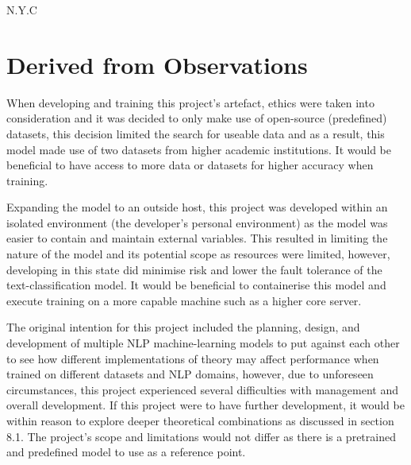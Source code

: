 N.Y.C

\section{Derived from Observations}

When developing and training this project’s artefact, ethics were taken into consideration and it was decided to only make use of open-source (predefined) datasets, this decision limited the search for useable data and as a result, this model made use of two datasets from higher academic institutions. It would be beneficial to have access to more data or datasets for higher accuracy when training.

Expanding the model to an outside host, this project was developed within an isolated environment (the developer’s personal environment) as the model was easier to contain and maintain external variables. This resulted in limiting the nature of the model and its potential scope as resources were limited, however, developing in this state did minimise risk and lower the fault tolerance of the text-classification model. It would be beneficial to containerise this model and execute training on a more capable machine such as a higher core server.

The original intention for this project included the planning, design, and development of multiple NLP machine-learning models to put against each other to see how different implementations of theory may affect performance when trained on different datasets and NLP domains, however, due to unforeseen circumstances, this project experienced several difficulties with management and overall development. If this project were to have further development, it would be within reason to explore deeper theoretical combinations as discussed in section 8.1. The project’s scope and limitations would not differ as there is a pretrained and predefined model to use as a reference point.
